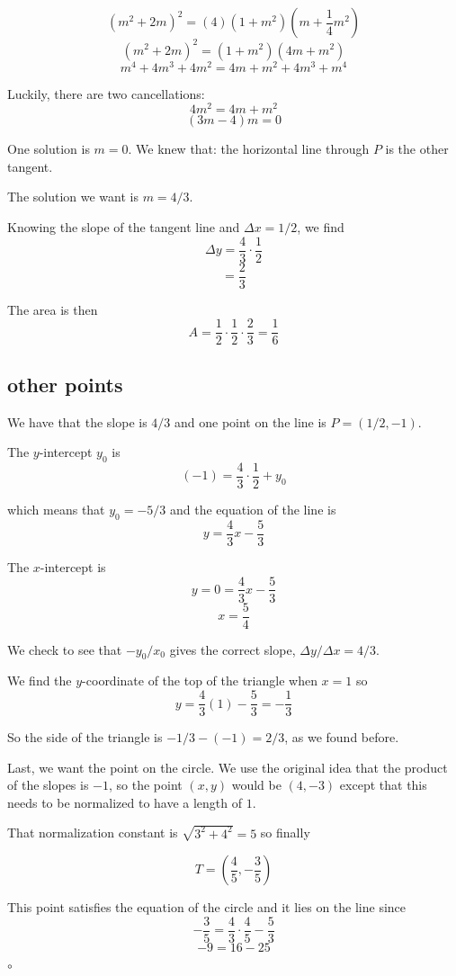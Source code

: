 \documentclass[11pt, oneside]{article}
\begin{document}
\[ (m^2 + 2m)^2 = (4)(1 + m^2)(m + \frac{1}{4}m^2) \]
\[ (m^2 + 2m)^2 = (1 + m^2)(4m + m^2) \]
\[ m^4 + 4m^3 + 4m^2 = 4m + m^2 + 4m^3 + m^4 \]

Luckily, there are two cancellations:
\[ 4m^2 = 4m + m^2 \]
\[ (3m - 4)m = 0 \]

One solution is $m=0$.  We knew that:  the horizontal line through $P$ is the other tangent.  

The solution we want is $m = 4/3$.

Knowing the slope of the tangent line and $\Delta x = 1/2$, we find
\[ \Delta y = \frac{4}{3} \cdot \frac{1}{2} \]
\[ = \frac{2}{3} \]

The area is then
\[ A = \frac{1}{2} \cdot \frac{1}{2} \cdot \frac{2}{3} = \frac{1}{6}  \]

\subsection*{other points}

We have that the slope is $4/3$ and one point on the line is $P=(1/2,-1)$.  

The $y$-intercept $y_0$ is
\[ (-1) = \frac{4}{3} \cdot \frac{1}{2} + y_0 \]

which means that $y_0 = -5/3$ and the equation of the line is
\[ y = \frac{4}{3}x - \frac{5}{3} \]

The $x$-intercept is 
\[ y = 0 = \frac{4}{3}x - \frac{5}{3} \]
\[ x = \frac{5}{4} \]

We check to see that $-y_0/x_0$ gives the correct slope, $\Delta y/\Delta x = 4/3$.

We find the $y$-coordinate of the top of the triangle when $x = 1$ so
\[ y = \frac{4}{3}(1) - \frac{5}{3} = - \frac{1}{3} \]

So the side of the triangle is $-1/3 - (-1) = 2/3$, as we found before.

Last, we want the point on the circle.  We use the original idea that the product of the slopes is $-1$, so the point $(x,y)$ would be $(4,-3)$ except that this needs to be normalized to have a length of $1$.  

That normalization constant is $\sqrt{3^2 + 4^2} = 5$ so finally

\[ T = (\frac{4}{5}, -\frac{3}{5}) \]

This point satisfies the equation of the circle and it lies on the line since
\[ -\frac{3}{5} = \frac{4}{3} \cdot \frac{4}{5} - \frac{5}{3}  \]
\[ -9 = 16 - 25 \]

$\circ$
\end{document}
